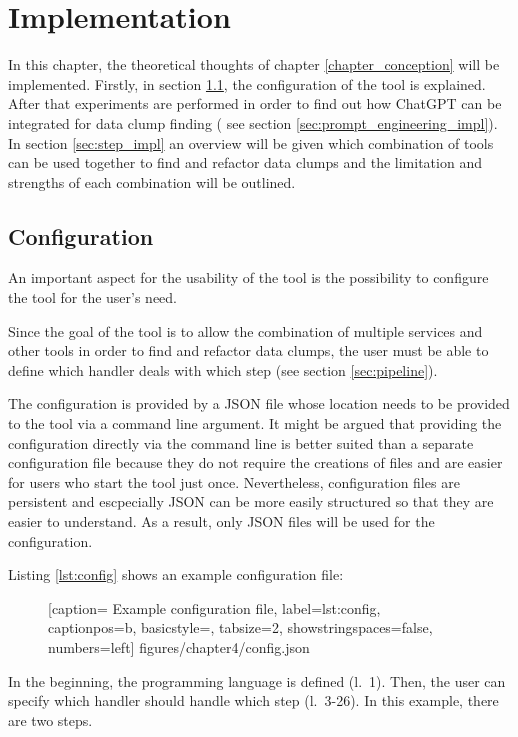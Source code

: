 
\begingroup
\renewcommand{\cleardoublepage}{} %
\renewcommand{\clearpage}{}
\chapter{Implementation}\label{chapter:implementation}
\endgroup
In this chapter, the theoretical thoughts of chapter \ref{chapter_conception} will be implemented. Firstly, in section \ref{sec:config}, the configuration of the tool is explained. After that experiments are performed in order to find out how ChatGPT can be integrated for data clump finding ( see section \ref{sec:prompt_engineering_impl}). In section \ref{sec:step_impl} an overview will be given which combination of tools can be used together to find and refactor data clumps and the limitation and strengths of each combination will be outlined. 
\section{Configuration}\label{sec:config}
An important aspect for the usability of the tool is the possibility to configure the tool for the user's need. 

Since the goal of the tool is to allow the combination of multiple services and other tools in order to find and refactor data clumps, the user must be able to define which handler deals with which step (see section \ref{sec:pipeline}).

The configuration is provided by a \ac{JSON} file whose location needs to be provided to the tool via a command line argument. It might be argued that providing the configuration directly via the command line is better suited than a separate configuration file because they do not require the creations of files and are easier for users who start the tool just once. Nevertheless, configuration files are persistent and escpecially \ac{JSON} can be more easily structured so that they are easier to understand. As a result, only \ac{JSON} files will be used  for the configuration. 


Listing \ref{lst:config} shows an example configuration file:
  \begin{figure} [htbp!]
			
			[caption={ Example configuration file},
			label={lst:config},
			captionpos=b, basicstyle=\footnotesize, tabsize=2, showstringspaces=false,  numbers=left]
			{figures/chapter4/config.json}
		\end{figure}


In the beginning, the programming language is defined (l.~1). Then, the user can specify which handler should handle which step (l.~3-26). In this example, there are two steps. 

